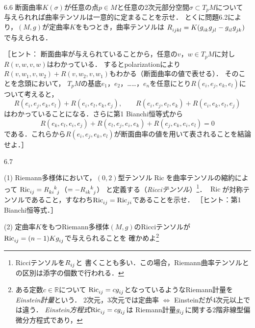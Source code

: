 \documentclass[uplatex,dvipdfmx,fontsize=12pt,jafontsize=11pt,line_length=42zw,number_of_lines=36,hanging_punctuation]{jlreq}
\DeclareMathOperator{\Ric}{Ric}
\begin{document}
\clearpage

\begin{problems}
	\item[6.6]
		断面曲率$K(\sigma)$が任意の点$p\in M$と任意の2次元部分空間$\sigma\subset T_pM$について
		与えられれば曲率テンソルは一意的に定まることを示せ．
		とくに問題6.2により，$(M,g)$が定曲率$K$をもつとき，曲率テンソルは
		$\tensor{R}{_i_j_k_l}=K(\tensor{g}{_i_k}\tensor{g}{_j_l}-\tensor{g}{_i_l}\tensor{g}{_j_k})$
		で与えられる．
		
		［ヒント：
		断面曲率が与えられていることから，任意の$v$，$w\in T_pM$に対し$R(v,w,v,w)$はわかっている．
		するとpolarizationにより$R(v,w_1,v,w_2)+R(v,w_2,v,w_1)$もわかる（断面曲率の値で表せる）．
		そのことを念頭において，
		$T_pM$の基底$e_1$，$e_2$，……，$e_n$を任意にとり$R(e_i,e_j,e_k,e_l)$について考えると，
		\begin{equation}
			R(e_i,e_j,e_k,e_l)+R(e_i,e_l,e_k,e_j),\qquad
			R(e_i,e_j,e_l,e_k)+R(e_i,e_k,e_l,e_j)
		\end{equation}
		はわかっていることになる．さらに第1 Bianchi恒等式から
		\begin{equation}
			R(e_k,e_l,e_i,e_j)+R(e_l,e_j,e_i,e_k)+R(e_j,e_k,e_i,e_l)=0
		\end{equation}
		である．これらから$R(e_i,e_j,e_k,e_l)$が断面曲率の値を用いて表されることを結論せよ．］
	\item[6.7]\phantom{}
		\begin{subproblems}
			\item[(1)]\vspace{-\baselineskip}
				Riemann多様体において，$(0,2)$型テンソル$\Ric$を曲率テンソルの縮約によって
				$\tensor{\Ric}{_i_j}=\tensor{R}{_k_i^k_j}$（$=-\tensor{R}{_i_k^k_j}$）
				と定義する（\emph{Ricciテンソル}）\footnote{Ricciテンソルを$\tensor{R}{_i_j}$と
				書くことも多い．この場合，Riemann曲率テンソルとの区別は添字の個数で行われる．}．
				$\Ric$が対称テンソルであること，すなわち$\tensor{\Ric}{_i_j}=\tensor{\Ric}{_j_i}$であることを示せ．
				［ヒント：第1 Bianchi恒等式．］
			\item[(2)]
				定曲率$K$をもつRiemann多様体$(M,g)$のRicciテンソルが
				$\tensor{\Ric}{_i_j}=(n-1)K\tensor{g}{_i_j}$で与えられることを
				確かめよ\footnote{ある定数$c\in\mathbb{R}$について
				$\tensor{\Ric}{_i_j}=c\tensor{g}{_i_j}$となっているようなRiemann計量を
				\emph{Einstein計量}という．
				2次元，3次元では定曲率 $\Longleftrightarrow$ Einsteinだが4次元以上では違う．
				\emph{Einstein方程式}$\tensor{\Ric}{_i_j}=c\tensor{g}{_i_j}$は
				Riemann計量$\tensor{g}{_i_j}$に関する2階非線型偏微分方程式であり，
}
\end{subproblems}
\end{problems}
\end{document}
